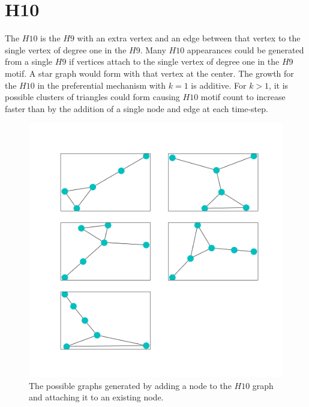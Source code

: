 \section{H10}
The $H10$ is the $H9$ with an extra vertex and an edge between that vertex to the 
single vertex of degree one in the $H9$. Many $H10$ appearances could be generated from a single $H9$ if vertices
attach to the single vertex of degree one in the $H9$ motif. A star graph would form
with that vertex at the center. The growth for the $H10$ in the preferential mechanism with $k=1$ is additive.
For $k>1$, it is possible clusters of triangles could form causing $H10$ motif count to increase faster than by the addition of a single node and edge at each time-step. 

\begin{figure}[!ht]
    \includegraphics[width=12cm]{Images/H10_evolution.png}
    \centering
    \caption{The possible graphs generated by adding a node to the $H10$ graph 
    and attaching it to an existing node.}
\end{figure}

